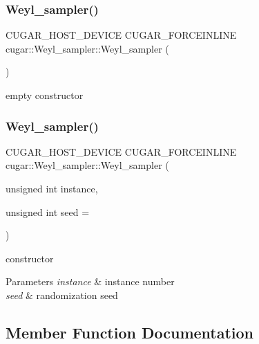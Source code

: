 \subsubsection{\texorpdfstring{Weyl\+\_\+sampler()}{Weyl\_sampler()}\hspace{0.1cm}{\footnotesize\ttfamily [1/2]}}
{\footnotesize\ttfamily C\+U\+G\+A\+R\+\_\+\+H\+O\+S\+T\+\_\+\+D\+E\+V\+I\+CE C\+U\+G\+A\+R\+\_\+\+F\+O\+R\+C\+E\+I\+N\+L\+I\+NE cugar\+::\+Weyl\+\_\+sampler\+::\+Weyl\+\_\+sampler (\begin{DoxyParamCaption}{ }\end{DoxyParamCaption})\hspace{0.3cm}{\ttfamily [inline]}}

empty constructor \mbox{\label{classcugar_1_1_weyl__sampler_a246414bfc5d0d95cf67efe50839e0a75}} 
\subsubsection{\texorpdfstring{Weyl\+\_\+sampler()}{Weyl\_sampler()}\hspace{0.1cm}{\footnotesize\ttfamily [2/2]}}
{\footnotesize\ttfamily C\+U\+G\+A\+R\+\_\+\+H\+O\+S\+T\+\_\+\+D\+E\+V\+I\+CE C\+U\+G\+A\+R\+\_\+\+F\+O\+R\+C\+E\+I\+N\+L\+I\+NE cugar\+::\+Weyl\+\_\+sampler\+::\+Weyl\+\_\+sampler (\begin{DoxyParamCaption}\item[{unsigned int}]{instance,  }\item[{unsigned int}]{seed = {} }\end{DoxyParamCaption})\hspace{0.3cm}{\ttfamily [inline]}}

constructor


\begin{DoxyParams}{Parameters}
{\em instance} & instance number \\
\hline
{\em seed} & randomization seed \\
\hline
\end{DoxyParams}


\subsection{Member Function Documentation}
\mbox{\label{classcugar_1_1_weyl__sampler_aedcdee9cfb11e41c431e550c485ba035}} 
